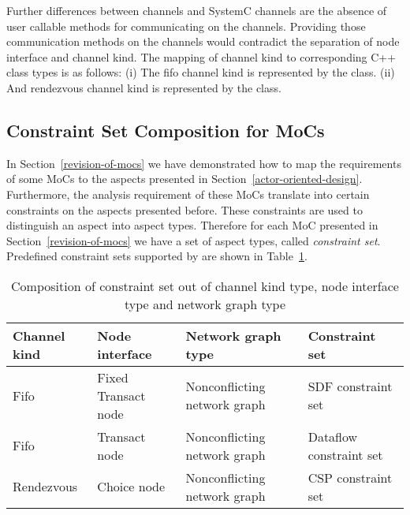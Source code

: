 Further differences between \SysteMoC{} channels and SystemC channels are the
absence of user callable methods for communicating on the \SysteMoC{} channels.
Providing those communication methods on the channels would contradict the separation
of node interface and channel kind. The mapping of channel kind to corresponding C++
class types is as follows:
(i) The fifo channel kind is represented by the  class.
(ii) And rendezvous channel kind is represented by the  class.


\subsection{Constraint Set Composition for MoCs}

In Section~\ref{revision-of-mocs} we have demonstrated how
to map the requirements of some MoCs to the aspects presented
in Section~\ref{actor-oriented-design}. Furthermore, the analysis
requirement of these MoCs translate into certain constraints
on the aspects presented before. These constraints are
used to distinguish an aspect into aspect types. Therefore
for each MoC presented in Section~\ref{revision-of-mocs}
we have a set of aspect types, called \emph{constraint set}.
Predefined constraint sets supported by \SysteMoC{} are
shown in Table~\ref{constraintset-composition}.

\begin{table}[h]
\centering
\begin{tabular}{|l|l|l|l|}
\hline
 Channel kind & Node interface & Network graph type & Constraint set \\
\hline \hline
 Fifo         & Fixed Transact node & Nonconflicting network graph & SDF constraint set \\
 Fifo         & Transact node       & Nonconflicting network graph & Dataflow constraint set \\
 Rendezvous   & Choice node         & Nonconflicting network graph & CSP constraint set \\
\hline
\end{tabular}
\caption{\label{constraintset-composition}
  Composition of constraint set out of channel kind type, node interface type
  and network graph type}
\end{table}

